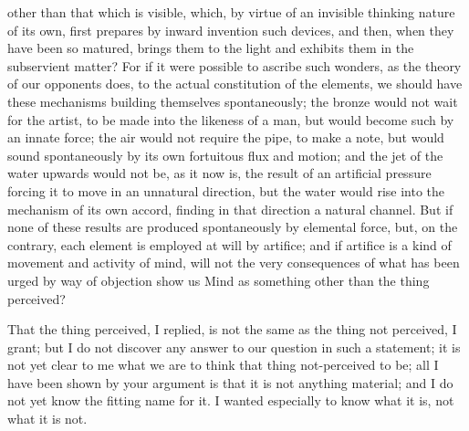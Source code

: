 other than that which is visible, which, by virtue of an invisible thinking nature of its own, first prepares by inward invention such devices, and then, when they have been so matured, brings them to the light and exhibits them in the subservient matter? For if it were possible to ascribe such wonders, as the theory of our opponents does, to the actual constitution of the elements, we should have these mechanisms building themselves spontaneously; the bronze would not wait for the artist, to be made into the likeness of a man, but would become such by an innate force; the air would not require the pipe, to make a note, but would sound spontaneously by its own fortuitous flux and motion; and the jet of the water upwards would not be, as it now is, the result of an artificial pressure forcing it to move in an unnatural direction, but the water would rise into the mechanism of its own accord, finding in that direction a natural channel. But if none of these results are produced spontaneously by elemental force, but, on the contrary, each element is employed at will by artifice; and if artifice is a kind of movement and activity of mind, will not the very consequences of what has been urged by way of objection show us Mind as something other than the thing perceived?

That the thing perceived, I replied, is not the same as the thing not perceived, I grant; but I do not discover any answer to our question in such a statement; it is not yet clear to me what we are to think that thing not-perceived to be; all I have been shown by your argument is that it is not anything material; and I do not yet know the fitting name for it. I wanted especially to know what it is, not what it is not.

